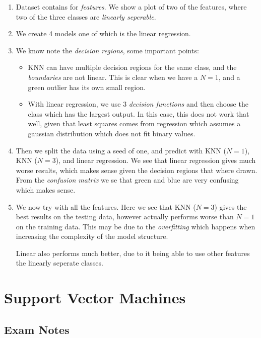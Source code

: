 \begin{enumerate}
    \item Dataset contains for \emph{features}. We show a plot of two of the features, where two of the three classes are \emph{linearly seperable}.
    \item We create 4 models one of which is the linear regression.
    \item We know note the \emph{decision regions}, some important points:
        \begin{itemize}
            \item KNN can have multiple decision regions for the same class, and the \emph{boundaries} are not linear.
                This is clear when we have a $N=1$, and a green outlier has its own small region.
            \item With linear regression, we use 3 \emph{decision functions} and then choose the class which has the largest output.
                In this case, this does not work that well, given that least squares comes from regression which assumes a gaussian distribution which does not fit binary values.
        \end{itemize}
    \item Then we split the data using a seed of one, and predict with KNN ($N=1$), KNN ($N=3$), and linear regression.
        We see that linear regression gives much worse results, which makes sense given the decision regions that where drawn.
        From the \emph{confusion matrix} we se that green and blue are very confusing which makes sense.
    \item We now try with all the features.
        Here we see that KNN ($N=3$) gives the best results on the testing data, however actually performs worse than $N=1$ on the training data.
        This may be due to the \emph{overfitting} which happens when increasing the complexity of the model structure.

        Linear also performs much better, due to it being able to use other features the linearly seperate classes.
\end{enumerate}


\section{Support Vector Machines}

\subsection{Exam Notes}

